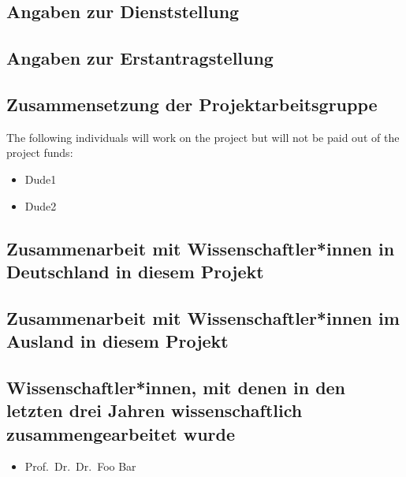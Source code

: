 \documentclass[ngerman]{scrartcl}
\begin{document}
\subsection{Angaben zur Dienststellung}

\subsection{Angaben zur Erstantragstellung}

\subsection{Zusammensetzung der Projektarbeitsgruppe}

The following individuals will work on the project but will not be paid out of the project funds:

\begin{itemize}
\item Dude1
\item Dude2
\end{itemize}

\subsection{Zusammenarbeit mit Wissenschaftler*innen in Deutschland in diesem Projekt}

\subsection{Zusammenarbeit mit Wissenschaftler*innen im Ausland in diesem Projekt}

\subsection{Wissenschaftler*innen, mit denen in den letzten drei Jahren wissenschaftlich zusammengearbeitet wurde}
\begin{itemize}
  \item Prof.\ Dr.\ Dr.\ Foo Bar
\end{itemize}
\end{document}
